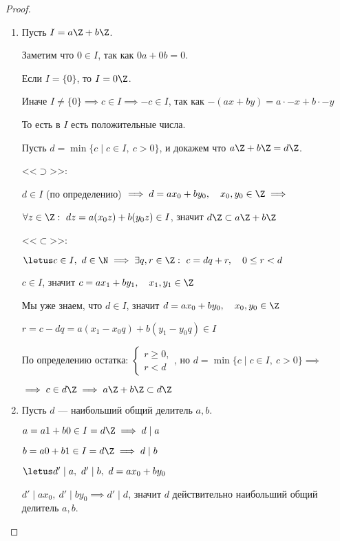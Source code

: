 \begin{proof}~
    \begin{enumerate}
        \item Пусть $I = a\Z + b\Z$.
        
        Заметим что $0 \in I$, так как $0a + 0b = 0$.
        
        Если $I = \{0\}$, то $I = 0\Z$.
        
        Иначе $I \neq \{0\} \implies c \in I \implies -c \in I$, так как $-(ax + by) = a \cdot -x + b \cdot -y$
        
        То есть в $I$ есть положительные числа.
        
        Пусть $d = \min\{ c \mid c \in I,~ c > 0 \}$, и докажем что $a\Z + b\Z = d\Z$.
        
        <<$\supset$>>:
        
        $d \in I$ (по определению) $\implies d = ax_0 + by_0, \quad x_0, y_0 \in \Z \implies$
        
        $\forall z \in \Z:\ dz = a(x_0z) + b(y_0z) \in I$, значит $d\Z \subset a\Z + b\Z$
        
        <<$\subset$>>:
        
        $\letus c \in I,~ d \in \N \implies \exists q, r \in \Z:\ c = dq + r, \quad 0 \leq r < d$
        
        $c \in I$, значит $c = ax_1 + by_1, \quad x_1, y_1 \in \Z$
        
        Мы уже знаем, что $d \in I$, значит $d = ax_0 + by_0, \quad x_0, y_0 \in \Z$ 
        
        $r = c - dq = a(x_1 -x_0q) + b(y_1 - y_0q) \in I$

        По определению остатка: $\begin{cases} 
            r \geq 0,\\
            r < d 
        \end{cases}$, но $d = \min\{ c \mid c \in I,~ c > 0 \} \implies$ 
        
        $\implies c \in d\Z \implies a\Z + b\Z \subset d\Z$
        
        \item Пусть $d$ --- наибольший общий делитель $a, b$.
        
        $a = a1 + b0 \in I = d\Z \implies d \mid a$
        
        $b = a0 + b1 \in I = d\Z \implies d \mid b$
        
        $\letus d' \mid a,~d' \mid b,~d=ax_0 + by_0$
        
        $d' \mid ax_0,~d' \mid by_0 \implies d' \mid d$, значит $d$ действительно наибольший общий делитель $a, b$.
    \end{enumerate}
\end{proof}

